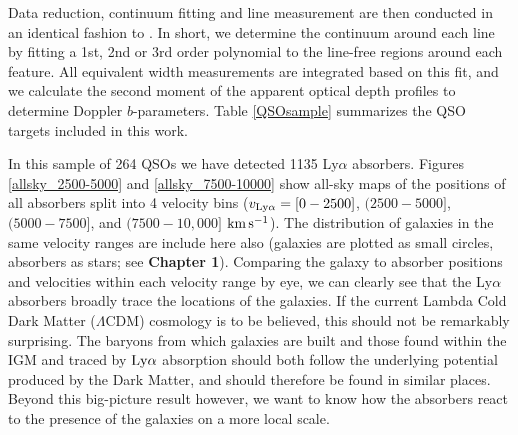 \documentclass[twocolumn,tighten]{aastex62}
\newcommand{\kms}{$\rm km\, s^{-1}$}
\begin{document}
Data reduction, continuum fitting and line measurement are then conducted in an identical fashion to \cite{french2017}. In short, we determine the continuum around each line by fitting a 1st, 2nd or 3rd order polynomial to the line-free regions around each feature. All equivalent width measurements are integrated based on this fit, and we calculate the second moment of the apparent optical depth profiles to determine Doppler $b$-parameters. Table \ref{QSOsample} summarizes the QSO targets included in this work.

In this sample of 264 QSOs we have detected 1135 Ly$\alpha$ absorbers. Figures \ref{allsky_2500-5000} and \ref{allsky_7500-10000} show all-sky maps of the positions of all absorbers split into 4 velocity bins ($v_{\rm Ly\alpha} = [0 - 2500]$, $(2500 - 5000]$, $(5000 - 7500]$, and $(7500 - 10,000]$ \kms). The distribution of galaxies in the same velocity ranges are include here also (galaxies are plotted as small circles, absorbers as stars; see \textbf{Chapter 1}). Comparing the galaxy to absorber positions and velocities within each velocity range by eye, we can clearly see that the Ly$\alpha$ absorbers broadly trace the locations of the galaxies. If the current Lambda Cold Dark Matter ($\Lambda$CDM) cosmology is to be believed, this should not be remarkably surprising. The baryons from which galaxies are built and those found within the IGM and traced by $\rm Ly\alpha$ absorption should both follow the underlying potential produced by the Dark Matter, and should therefore be found in similar places. Beyond this big-picture result however, we want to know how the absorbers react to the presence of the galaxies on a more local scale.
\end{document}
